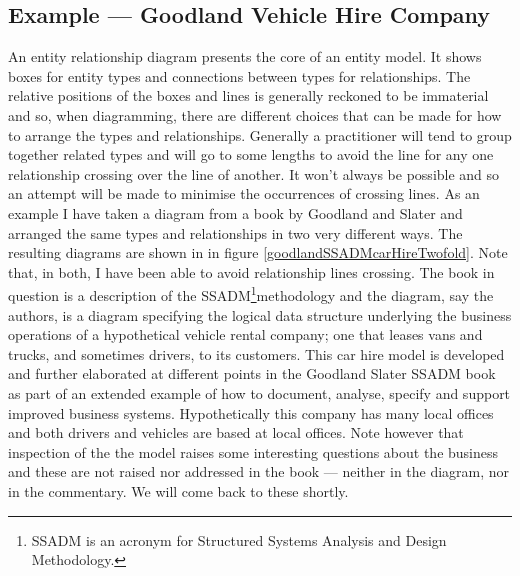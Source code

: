 \subsection{Example --- Goodland Vehicle Hire Company}
\label{GoodlandVehicleHireCompany}
\mynote
An entity relationship diagram presents the core of an entity model.
It shows boxes for entity types and connections between types for relationships.
\mynote
The relative positions of the boxes and lines is generally reckoned to be immaterial and so, 
when diagramming, there
are  different choices that can be made for how to arrange the types and relationships. 
Generally a practitioner will tend to group together related types and will 
 go to some lengths to avoid the line for any one relationship crossing over the line of another.
It won't always be possible and so an attempt will be made to minimise the occurrences of crossing lines.    
As an example I have taken a diagram from a book by Goodland and Slater and arranged the same types and relationships in two very different ways. The resulting diagrams are shown in  in figure \ref{goodlandSSADMcarHireTwofold}.  Note that, in both, I have been able to avoid relationship lines crossing.
The book in question is a description of the SSADM\footnote{SSADM is an acronym for Structured Systems Analysis and Design Methodology.}methodology and
the diagram, say the authors, is a diagram specifying the logical data structure underlying the business operations of a hypothetical vehicle rental company; one that leases vans and trucks, and sometimes drivers, to its customers. 
\mynote
This car hire model is developed and further elaborated at different points in the Goodland Slater SSADM book as part of an extended example of how to document, analyse, specify and support improved business systems. 
\mynote 
Hypothetically this company has many local offices and both drivers and vehicles are based at local offices. 
Note however that inspection of the the model raises some interesting questions about the business 
and these are not raised nor addressed in the book ---
neither in the diagram, nor in the commentary. 
We will come back to these shortly.

